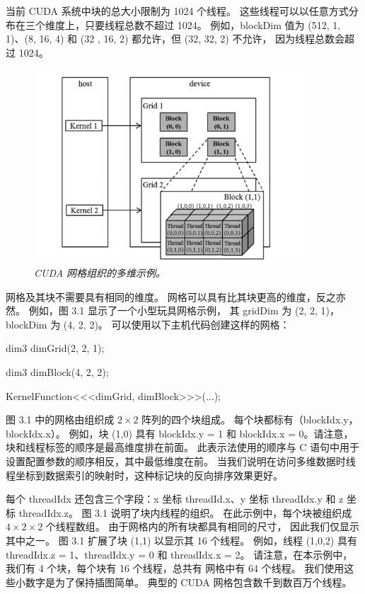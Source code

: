 当前 CUDA 系统中块的总大小限制为 1024 个线程。 这些线程可以以任意方式分布在三个维度上，只要线程总数不超过 1024。
例如，blockDim 值为 (512, 1, 1)、(8, 16, 4) 和 (32 , 16, 2) 都允许，但 (32, 32, 2) 不允许，
因为线程总数会超过 1024。

\begin{figure}[H]
	\centering
	\includegraphics[width=0.9\textwidth]{figs/F3.1.png}
	\caption{\textit{CUDA 网格组织的多维示例。}}
\end{figure}

网格及其块不需要具有相同的维度。 网格可以具有比其块更高的维度，反之亦然。 例如，图 3.1 显示了一个小型玩具网格示例，
其 gridDim 为 (2, 2, 1)，blockDim 为 (4, 2, 2)。 可以使用以下主机代码创建这样的网格：

dim3 dimGrid(2, 2, 1);

dim3 dimBlock(4, 2, 2);

KernelFunction<<<dimGrid, dimBlock>>>(...);

图 3.1 中的网格由组织成 $2 \times 2$ 阵列的四个块组成。 每个块都标有（blockIdx.y，blockIdx.x）。 
例如，块 (1,0) 具有 blockIdx.y = 1 和 blockIdx.x = 0。请注意，块和线程标签的顺序是最高维度排在前面。 
此表示法使用的顺序与 C 语句中用于设置配置参数的顺序相反，其中最低维度在前。 
当我们说明在访问多维数据时线程坐标到数据索引的映射时，这种标记块的反向排序效果更好。

每个 threadIdx 还包含三个字段：x 坐标 threadId.x、y 坐标 threadIdx.y 和 z 坐标 threadIdx.z。 
图 3.1 说明了块内线程的组织。 在此示例中，每个块被组织成 $4 \times 2 \times 2$ 个线程数组。 
由于网格内的所有块都具有相同的尺寸，
因此我们仅显示其中之一。 图 3.1 扩展了块 (1,1) 以显示其 16 个线程。 
例如，线程 (1,0,2) 具有 threadIdx.z = 1、threadIdx.y = 0 和 threadIdx.x = 2。
请注意，在本示例中，我们有 4 个块，每个块有 16 个线程，总共有 网格中有 64 个线程。 
我们使用这些小数字是为了保持插图简单。 典型的 CUDA 网格包含数千到数百万个线程。


